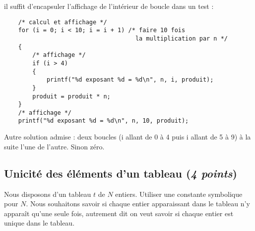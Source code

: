 \begin{correction}
il suffit d'encapsuler l'affichage de l'intérieur de boucle dans un
test :
\begin{small}
\begin{verbatim}
    /* calcul et affichage */
    for (i = 0; i < 10; i = i + 1) /* faire 10 fois 
                                     la multiplication par n */
    {
        /* affichage */
        if (i > 4) 
        {
            printf("%d exposant %d = %d\n", n, i, produit);
        }
        produit = produit * n;
    }
    /* affichage */
    printf("%d exposant %d = %d\n", n, 10, produit);
\end{verbatim}
\end{small}
  \begin{baremeenv}
    Autre solution admise : deux boucles (i allant de 0 à 4 puis i
    allant de 5 à 9)  à la suite l'une de l'autre. Sinon zéro.
 \end{baremeenv}
\end{correction}



\subsection{Unicité des éléments d'un tableau (\emph{4 points})}

Nous disposons d'un tableau $t$ de $N$ entiers. Utiliser une constante
symbolique pour $N$. Nous souhaitons
savoir si chaque entier apparaissant dans le tableau n'y apparaît
qu'une seule fois, autrement dit on veut savoir si chaque entier
est unique dans le tableau.

